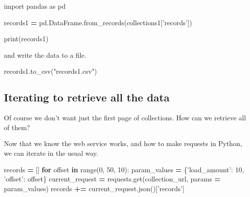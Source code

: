 \documentclass[]{book}
\newenvironment{Shaded}{\begin{snugshade}}{\end{snugshade}}
\newcommand{\KeywordTok}[1]{\textcolor[rgb]{0.13,0.29,0.53}{\textbf{#1}}}
\newcommand{\DecValTok}[1]{\textcolor[rgb]{0.00,0.00,0.81}{#1}}
\newcommand{\StringTok}[1]{\textcolor[rgb]{0.31,0.60,0.02}{#1}}
\newcommand{\ImportTok}[1]{#1}
\newcommand{\ControlFlowTok}[1]{\textcolor[rgb]{0.13,0.29,0.53}{\textbf{#1}}}
\newcommand{\OperatorTok}[1]{\textcolor[rgb]{0.81,0.36,0.00}{\textbf{#1}}}
\newcommand{\BuiltInTok}[1]{#1}
\newcommand{\NormalTok}[1]{#1}
\begin{document}
\begin{Shaded}
\begin{Highlighting}[]
\ImportTok{import}\NormalTok{ pandas }\ImportTok{as}\NormalTok{ pd}
\end{Highlighting}
\end{Shaded}

\begin{Shaded}
\begin{Highlighting}[]
\NormalTok{records1 }\OperatorTok{=}\NormalTok{ pd.DataFrame.from_records(collections1[}\StringTok{'records'}\NormalTok{])}
\end{Highlighting}
\end{Shaded}

\begin{Shaded}
\begin{Highlighting}[]
\BuiltInTok{print}\NormalTok{(records1)}
\end{Highlighting}
\end{Shaded}

and write the data to a file.

\begin{Shaded}
\begin{Highlighting}[]
\NormalTok{records1.to_csv(}\StringTok{"records1.csv"}\NormalTok{)}
\end{Highlighting}
\end{Shaded}

\subsection{Iterating to retrieve all the
data}\label{iterating-to-retrieve-all-the-data}

Of course we don't want just the first page of collections. How can we
retrieve all of them?

Now that we know the web service works, and how to make requests in
Python, we can iterate in the usual way.

\begin{Shaded}
\begin{Highlighting}[]
\NormalTok{records }\OperatorTok{=}\NormalTok{ []}
\ControlFlowTok{for}\NormalTok{ offset }\KeywordTok{in} \BuiltInTok{range}\NormalTok{(}\DecValTok{0}\NormalTok{, }\DecValTok{50}\NormalTok{, }\DecValTok{10}\NormalTok{):}
\NormalTok{    param_values }\OperatorTok{=}\NormalTok{ \{}\StringTok{'load_amount'}\NormalTok{: }\DecValTok{10}\NormalTok{, }\StringTok{'offset'}\NormalTok{: offset\}}
\NormalTok{    current_request }\OperatorTok{=}\NormalTok{ requests.get(collection_url, params }\OperatorTok{=}\NormalTok{ param_values)}
\NormalTok{    records }\OperatorTok{+=}\NormalTok{ current_request.json()[}\StringTok{'records'}\NormalTok{]}
\end{Highlighting}
\end{Shaded}
\end{document}
